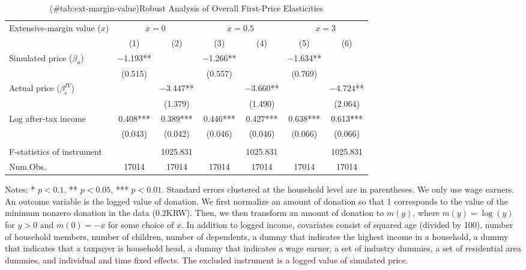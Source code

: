 \begin{table}

\caption{(\#tab:ext-margin-value)Robust Analysis of Overall First-Price Elasticities}
\centering
\fontsize{8}{10}\selectfont
\begin{threeparttable}
\begin{tabular}[t]{lcccccc}
\toprule
\multicolumn{1}{c}{Extensive-margin value ($x$)} & \multicolumn{2}{c}{$x = 0$} & \multicolumn{2}{c}{$x = 0.5$} & \multicolumn{2}{c}{$x = 3$} \\
\cmidrule(l{3pt}r{3pt}){1-1} \cmidrule(l{3pt}r{3pt}){2-3} \cmidrule(l{3pt}r{3pt}){4-5} \cmidrule(l{3pt}r{3pt}){6-7}
  & (1) & (2) & (3) & (4) & (5) & (6)\\
\midrule
Simulated price ($\beta_a$) & \num{-1.193}** &  & \num{-1.266}** &  & \num{-1.634}** & \\
 & (\num{0.515}) &  & (\num{0.557}) &  & (\num{0.769}) & \\
Actual price ($\beta^{IV}_e$) &  & \num{-3.447}** &  & \num{-3.660}** &  & \num{-4.724}**\\
 &  & (\num{1.379}) &  & (\num{1.490}) &  & (\num{2.064})\\
Log after-tax income & \num{0.408}*** & \num{0.389}*** & \num{0.446}*** & \num{0.427}*** & \num{0.638}*** & \num{0.613}***\\
 & (\num{0.043}) & (\num{0.042}) & (\num{0.046}) & (\num{0.046}) & (\num{0.066}) & (\num{0.066})\\
\midrule
\addlinespace[0.3em]
\multicolumn{7}{l}{\textit{1st stage information (Excluded instrument: Simulated price)}}\\
\hspace{1em}F-statistics of instrument &  & \num{1025.831} &  & \num{1025.831} &  & \num{1025.831}\\
Num.Obs. & \num{17014} & \num{17014} & \num{17014} & \num{17014} & \num{17014} & \num{17014}\\
\bottomrule
\end{tabular}
\begin{tablenotes}
\item Notes: * $p < 0.1$, ** $p < 0.05$, *** $p < 0.01$. Standard errors clustered at the household level are in parentheses. We only use wage earners. An outcome variable is the logged value of donation. We first normalize an amount of donation so that 1 corresponds to the value of the minimum nonzero donation in the data ($0.2$KRW). Then, we then transform an amount of donation to $m(g)$, where $m(y) = \log(y)$ for $y > 0$ and $m(0) = -x$ for some choice of $x$. In addition to logged income, covariates consist of squared age (divided by 100), number of household members, number of children, number of dependents, a dummy that indicates the highest income in a household, a dummy that indicates that a taxpayer is household head, a dummy that indicates a wage earner, a set of industry dummies, a set of residential area dummies, and individual and time fixed effects. The excluded instrument is a logged value of simulated price.
\end{tablenotes}
\end{threeparttable}
\end{table}

